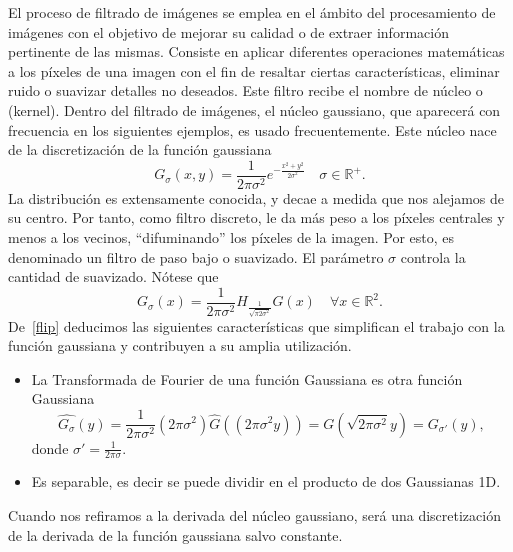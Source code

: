 \begin{observacion}
  El proceso de filtrado de imágenes se emplea en el ámbito del procesamiento de imágenes con el objetivo de mejorar su calidad o de extraer información pertinente de las mismas. Consiste en aplicar diferentes operaciones matemáticas a los píxeles de una imagen con el fin de resaltar ciertas características, eliminar ruido o suavizar detalles no deseados. Este  filtro recibe el nombre de núcleo o (kernel). Dentro del filtrado de imágenes, el núcleo gaussiano, que aparecerá con frecuencia en los siguientes ejemplos, es usado frecuentemente.
    Este núcleo nace de la discretización de la función gaussiana 
    \begin{equation}
        G_{\sigma}(x,y) = \frac{1}{2\pi \sigma^2}e^{-\frac{x^2+y^2}{2 \sigma^2}} \quad \sigma \in \mathbb{R}^+.
    \end{equation}
    La distribución es extensamente conocida, y decae a medida que nos alejamos de su centro. Por tanto, como filtro discreto, le da más peso a los píxeles centrales y menos a los vecinos, ``difuminando'' los píxeles de la imagen. Por esto, es denominado un filtro de paso bajo o suavizado. El parámetro $\sigma$ controla la cantidad de suavizado.
    Nótese que 
    \begin{equation}\label{flip}
        G_{\sigma}(x) = \frac{1}{2\pi \sigma^2}H_{\frac{1}{\sqrt{\pi 2 \sigma^2}}}G(x) \quad \forall x \in \mathbb{R}^2.
    \end{equation}   
    De~\eqref{flip} deducimos las siguientes características  que simplifican el trabajo con la función gaussiana y contribuyen a su amplia utilización. 
    \begin{itemize}
        \item La Transformada de Fourier de una función Gaussiana es otra función Gaussiana
         \begin{equation}
        \widehat{G_{\sigma}}(y) = \frac{1}{2\pi \sigma^2} (2\pi \sigma^2)\widehat{G}((2\pi \sigma^2 y)) =G(\sqrt{2\pi \sigma^2}y) = G_{\sigma'}(y),
    \end{equation}
        donde $\sigma' = \frac{1}{2 \pi \sigma}$.
        \item Es separable, es decir se puede dividir en el producto de dos Gaussianas 1D.
    \end{itemize}
\end{observacion}
\noindent Cuando nos refiramos a la derivada del núcleo gaussiano, será una discretización de la derivada de la función gaussiana salvo constante.

